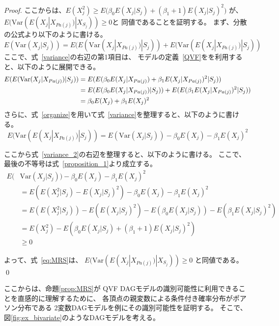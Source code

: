 \begin{proof}
  ここからは、$E(X_j^2) \geq E\bigl( \beta_0 E(X_j | S_j) +
  (\beta_1 + 1) E(X_j | S_j)^2 \bigl)$ が、
  $E(\mathrm{Var}( E(X_j | X_{Pa(j)}) | X_{S_j} )) \geq 0$と
  同値であることを証明する。
  まず、分散の公式より以下のように書ける。
  \begin{equation}
    \label{variance}
    E(\mathrm{Var}(X_j | S_j))
     = E(E(\mathrm{Var}(X_j | X_{Pa(j)}) | S_j)) + E(\mathrm{Var}(E(X_j | X_{Pa(j)}) | S_j))
  \end{equation}
  ここで、式~\eqref{variance}の右辺の第1項目は、
  モデルの定義~\eqref{QVF}をを利用すると、以下のように展開できる。
  \begin{align}
    E(E(\mathrm{Var}(X_j | X_{Pa(j)}) | S_j))
      &= E(E(\beta_0 E(X_j | X_{Pa(j)}) + \beta_1 E(X_j | X_{Pa(j)})^2 | S_j)) \notag \\
      &= E(E(\beta_0 E(X_j | X_{Pa(j)}) | S_j)) + E(E(\beta_1 E(X_j | X_{Pa(j)})^2 | S_j)) \notag \\
      &= \beta_0 E(X_j) + \beta_1 E(X_j)^2
      \label{organize}
  \end{align}
  さらに、式~\eqref{organize}を用いて式~\eqref{variance}を整理すると、以下のように書ける。
  \begin{equation}
    \label{variance_2}
    E(\mathrm{Var}(E(X_j | X_{Pa(j)}) | S_j))
     = E(\mathrm{Var}(X_j | S_j)) - \beta_0 E(X_j) - \beta_1 E(X_j)^2
  \end{equation}

  ここから式~\eqref{variance_2}の右辺を整理すると、以下のように書ける。
  ここで、最後の不等号は式~\eqref{proposition_1}より成立する。
  \begin{align*}
    E(&\mathrm{Var}(X_j | S_j)) - \beta_0 E(X_j) - \beta_1 E(X_j)^2 \\
     &= E(E(X_j^2 | S_j) - E(X_j | S_j)^2) - \beta_0 E(X_j) - \beta_1 E(X_j)^2 \\
     &= E(E(X_j^2 | S_j)) - E(E(X_j | S_j)^2) - E(\beta_0 E(X_j | S_j)) - E(\beta_1 E(X_j | S_j)^2) \\
     &= E(X_j^2) - E(\beta_0 E(X_j | S_j) + (\beta_1 + 1) E(X_j | S_j)^2) \\
     & \geq 0
  \end{align*}

  よって、式~\eqref{eq:MRS}は、
  $E(\mathrm{Var}( E(X_j | X_{Pa(j)}) | X_{S_j} )) \geq 0$
  と同値である。
  \qed

\end{proof}

ここからは、命題\ref{prop:MRS}が
QVF DAGモデルの識別可能性に利用できることを直感的に理解するために、
各頂点の親変数による条件付き確率分布がポアソン分布である
2変数DAGモデルを例にその識別可能性を証明する。
そこで、図\ref{fig:ex_bivariate}のようなDAGモデルを考える。

